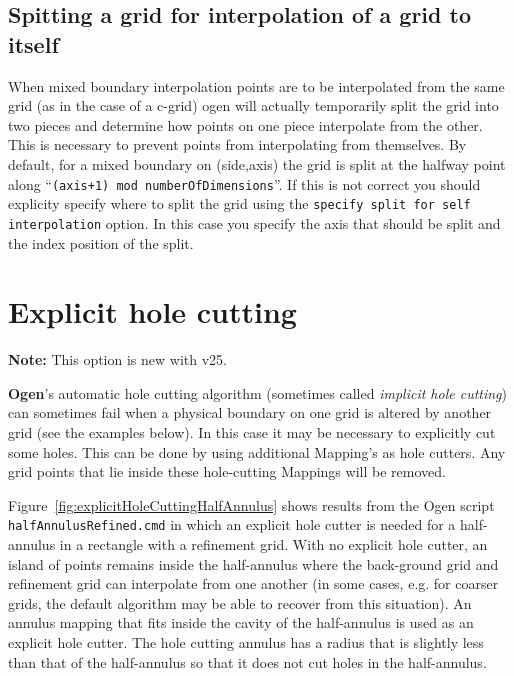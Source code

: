 \documentclass[xcolor=rgb,svgnames,dvipsnames]{article}
\newcommand{\ogen}{\OvertureDir/ogen}
\begin{document}

\subsection{Spitting a grid for interpolation of a grid to itself}

  When mixed boundary interpolation points are to be interpolated from the same grid (as in the
case of a c-grid) ogen will actually temporarily split the grid into two pieces and determine how points
on one piece interpolate from the other. This is necessary to prevent points from interpolating from
themselves. By default, for a mixed boundary on (side,axis) the grid is split at the halfway point
along ``{\tt (axis+1) mod numberOfDimensions}''. 
If this is not correct you should explicity
specify where to split the grid using the {\tt specify split for self interpolation} option.
In this case you specify the axis that should be split and the index position of the split.




\clearpage
\section{Explicit hole cutting}\label{sec:explicitHoleCutting}

{\bf Note:} This option is new with v25. 

{\bf Ogen}'s automatic hole cutting algorithm (sometimes called {\em implicit hole cutting}) can sometimes
fail when a physical boundary on one grid is altered by another grid (see the examples below). 
In this case it may be necessary to explicitly cut some holes. This can be done by using additional Mapping's
as hole cutters. Any grid points that lie inside these hole-cutting Mappings will be removed. 


Figure~\ref{fig:explicitHoleCuttingHalfAnnulus} shows results from the Ogen script {\tt halfAnnulusRefined.cmd} in which
an explicit hole cutter is needed for a half-annulus in a rectangle with a refinement grid.
With no explicit hole cutter, an island of points remains inside the half-annulus where the back-ground 
grid and refinement grid can interpolate from one another (in some cases, e.g. for coarser grids,
the default algorithm may be able to recover from this situation). 
An annulus mapping that fits inside the cavity of the 
half-annulus is used as an explicit hole cutter. The hole cutting annulus has a radius that is slightly less than that
of the half-annulus so that it does not cut holes in the half-annulus. 
\end{document}
